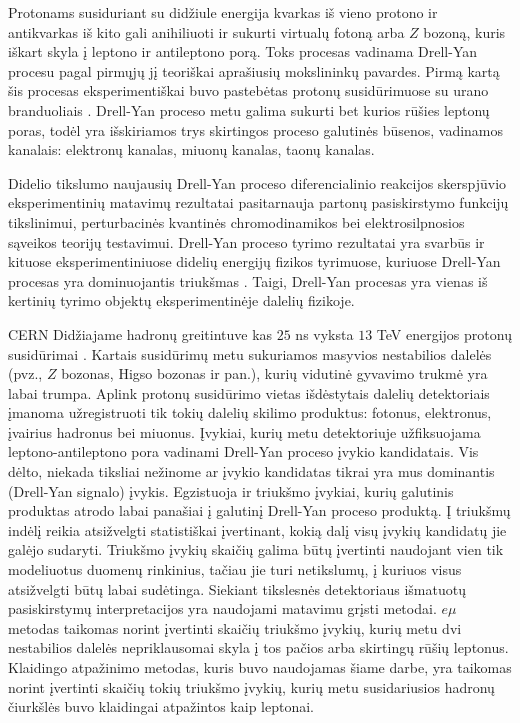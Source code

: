 \documentclass[a4paper, 12pt, oneside]{article}
\newcommand{\emu}{e\mu}
\begin{document}
Protonams susiduriant su didžiule energija kvarkas iš vieno protono ir antikvarkas iš kito gali anihiliuoti
ir sukurti virtualų fotoną arba $Z$ bozoną, kuris iškart skyla į leptono ir antileptono porą.
Toks procesas vadinama Drell-Yan procesu \cite{DYoriginal} pagal pirmųjų jį teoriškai aprašiusių mokslininkų pavardes.
Pirmą kartą šis procesas eksperimentiškai buvo pastebėtas protonų susidūrimuose su urano branduoliais \cite{DY_firstExp}.
Drell-Yan proceso metu galima sukurti bet kurios rūšies leptonų poras, todėl yra išskiriamos trys skirtingos
proceso galutinės būsenos, vadinamos kanalais: elektronų kanalas, miuonų kanalas, taonų kanalas.

Didelio tikslumo naujausių Drell-Yan proceso diferencialinio reakcijos skerspjūvio eksperimentinių matavimų
rezultatai \cite{DY2013, DY7TeVatlas, DY2015, DY8TeVatlas, DY2019} pasitarnauja partonų pasiskirstymo funkcijų
tikslinimui, perturbacinės kvantinės chromodinamikos bei elektrosilpnosios sąveikos teorijų testavimui.
Drell-Yan proceso tyrimo rezultatai yra svarbūs ir kituose eksperimentiniuose didelių energijų fizikos
tyrimuose, kuriuose Drell-Yan procesas yra dominuojantis triukšmas \cite{Higgs2018, Zprime, SUSYtau}.
Taigi, Drell-Yan procesas yra vienas iš  kertinių tyrimo objektų eksperimentinėje dalelių fizikoje.

CERN Didžiajame hadronų greitintuve kas $25$ ns vyksta $13$ TeV energijos protonų susidūrimai \cite{LHC_13TeV_25ns}.
Kartais susidūrimų metu sukuriamos masyvios nestabilios dalelės (pvz., $Z$ bozonas, Higso bozonas ir pan.),
kurių vidutinė gyvavimo trukmė yra labai trumpa.
Aplink protonų susidūrimo vietas išdėstytais dalelių detektoriais įmanoma užregistruoti tik tokių
dalelių skilimo produktus: fotonus, elektronus, įvairius hadronus bei miuonus.
Įvykiai, kurių metu detektoriuje užfiksuojama leptono-antileptono pora vadinami Drell-Yan proceso įvykio kandidatais.
Vis dėlto, niekada tiksliai nežinome ar įvykio kandidatas tikrai yra mus dominantis (Drell-Yan signalo) įvykis.
Egzistuoja ir triukšmo įvykiai, kurių galutinis produktas atrodo labai panašiai į galutinį Drell-Yan proceso produktą.
Į triukšmų indėlį reikia atsižvelgti statistiškai įvertinant, kokią dalį visų įvykių kandidatų jie galėjo sudaryti.
Triukšmo įvykių skaičių galima būtų įvertinti naudojant vien tik modeliuotus duomenų rinkinius, tačiau jie turi
netikslumų, į kuriuos visus atsižvelgti būtų labai sudėtinga.
Siekiant tikslesnės detektoriaus išmatuotų pasiskirstymų interpretacijos yra naudojami matavimu grįsti metodai.
$\emu$ metodas taikomas norint įvertinti skaičių triukšmo įvykių, kurių metu dvi nestabilios dalelės nepriklausomai
skyla į tos pačios arba skirtingų rūšių leptonus.
Klaidingo atpažinimo metodas, kuris buvo naudojamas šiame darbe, yra taikomas norint įvertinti skaičių tokių triukšmo
įvykių, kurių metu susidariusios hadronų čiurkšlės buvo klaidingai atpažintos kaip leptonai.
\end{document}
